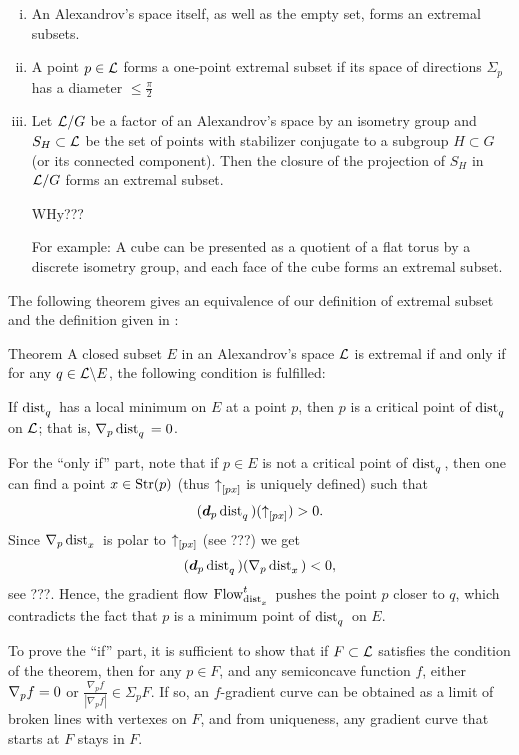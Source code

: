 \begin{enumerate}[(i)]
\item An Alexandrov's space itself, as well as the empty set, forms an extremal subsets.
\item A point $p\in \spc{L}$ forms a one-point extremal subset if its
space of directions $\Sigma_p$ has a diameter $\le\tfrac\pi2$

\item 
Let $\mathcal{L}/G$ be a factor of an Alexandrov's space by an isometry group and $S_H\subset \spc{L}$ be the set of points with stabilizer conjugate to a subgroup $H\subset G$ (or its connected component). 
Then the closure of the projection of $S_H$ in $\mathcal{L}/G$ forms an extremal subset.

WHy???

For example: A cube can be presented as a quotient of a flat torus by a discrete isometry group, and each face of the cube forms an extremal subset.

\end{enumerate}


\noi The following theorem gives an equivalence of our definition of extremal subset and the definition given in
\cite{perelman-petrunin:extremal}:

\begin{thm}{Theorem}\label{thm:dist-extr}  A closed subset $E$ in
an Alexandrov's space $\mathcal{L}$ is extremal if and only if for any $q\in \spc{L}\backslash E$,
the following condition is fulfilled:

If $\mathop{\rm dist}\nolimits_{q}^{{}}{}{}$ has a local minimum on $E$ at a point $p$, then $p$ is a critical
point of $\mathop{\rm dist}\nolimits_{q}^{{}}{}{}$ on $\mathcal{L}$; 
that is, $\nabla_p\mathop{\rm dist}\nolimits_{q}^{{}}{}{}=0$.
\end{thm}

 For the ``only if'' part, note that if $p\in E$ is not a critical point of
$\mathop{\rm dist}\nolimits_{q}^{{}}{}{}$, then one can find a point $x\in \Str(p)$ (thus ${\uparrow}_{[{p}{x}]}$ is
uniquely defined) such that 
\[(\bm{d}_p\mathop{\rm dist}\nolimits_{q}^{{}}{}{})({\uparrow}_{[{p}{x}]})>0.\] 
Since $\nabla_p\mathop{\rm dist}\nolimits_{x}^{{}}{}{}$ is polar to ${\uparrow}_{[{p}{x}]}$ (see
???) we get 
\[(\bm{d}_p\mathop{\rm dist}\nolimits_{q}^{{}}{}{})(\nabla_p\mathop{\rm dist}\nolimits_{x}^{{}}{}{})<0,\] 
see ???.
Hence, the gradient flow $\mathop{\rm Flow}\nolimits_{\mathop{\rm dist}\nolimits_{x}^{{}}{}{}}^t$ pushes the point $p$ closer to $q$, which
contradicts the fact that $p$ is a minimum point of $\mathop{\rm dist}\nolimits_{q}^{{}}{}{}$ on $E$.

To prove the ``if'' part, it is sufficient to show that if $F\subset \spc{L}$ satisfies the condition of the theorem,
then for any $p\in F$, and any semiconcave function $f$, either $\nabla_p f=0$ or 
$\tfrac{\nabla_p f}{|\nabla_p f|}\in \Sigma_p F$.
If so, an $f$-gradient curve
can be obtained as a limit of broken lines with vertexes on $F$, and from
uniqueness, any gradient curve that starts at $F$ stays in $F$.

